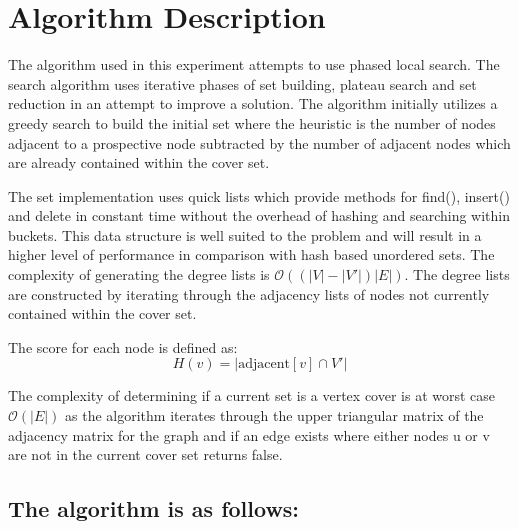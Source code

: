 \documentclass[conference,letterpaper]{IEEEtran}
\begin{document}
\section{Algorithm Description}
\par The algorithm used in this experiment attempts to use phased local search. The search algorithm uses iterative phases of set building, plateau search and set reduction in an attempt to improve a solution. The algorithm initially utilizes a greedy search to build the initial set where the heuristic is the number of nodes adjacent to a prospective node subtracted by the number of adjacent nodes which are already contained within the cover set.
\par The set implementation uses quick lists which provide methods for find(), insert() and delete in constant time without the overhead of hashing and searching within buckets. This data structure is well suited to the problem and will result in a higher level of performance in comparison with hash based unordered sets. The complexity of generating the degree lists is $\mathcal{O}((|V| - |V\prime|)|E|)$. The degree lists are constructed by iterating through the adjacency lists of nodes not currently contained within the cover set. 
\par The score for each node is defined as:
\begin{equation}
    H(v)=|\mbox{adjacent}[v] \cap V\prime|
\end{equation}
\par The complexity of determining if a current set is a vertex cover is at worst case $\mathcal{O}(|E|)$ as the algorithm iterates through the upper triangular matrix of the adjacency matrix for the graph and if an edge exists where either nodes u or v are not in the current cover set returns false.

\subsection{The algorithm is as follows:}

\end{document}
